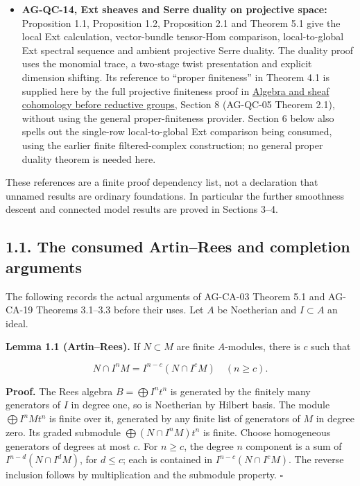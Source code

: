 \documentclass[11pt,a4paper,openany]{report}
\begin{document}
\begin{itemize}
\item
  \textbf{AG-QC-14, Ext sheaves and Serre duality on projective space:} Proposition 1.1, Proposition 1.2, Proposition 2.1 and Theorem 5.1 give the local Ext calculation, vector-bundle tensor-Hom comparison, local-to-global Ext spectral sequence and ambient projective Serre duality. The duality proof uses the monomial trace, a two-stage twist presentation and explicit dimension shifting. Its reference to ``proper finiteness'' in Theorem 4.1 is supplied here by the full projective finiteness proof in \href{https://github.com/KokunoYumeto/open-math-courses/blob/main/docs/courses/AG-RG/AG-RG-S01.md}{Algebra and sheaf cohomology before reductive groups}, Section 8 (AG-QC-05 Theorem 2.1), without using the general proper-finiteness provider. Section 6 below also spells out the single-row local-to-global Ext comparison being consumed, using the earlier finite filtered-complex construction; no general proper duality theorem is needed here.
\end{itemize}

These references are a finite proof dependency list, not a declaration that unnamed results are ordinary foundations. In particular the further smoothness descent and connected model results are proved in Sections 3--4.

\subsection{1.1. The consumed Artin--Rees and completion arguments}\label{AG-RG-S02-the-consumed-artinrees-and-completion-arguments}

The following records the actual arguments of AG-CA-03 Theorem 5.1 and AG-CA-19 Theorems 3.1--3.3 before their uses. Let \(A\) be Noetherian and \(I\subset A\) an ideal.

\textbf{Lemma 1.1 (Artin--Rees).} If \(N\subset M\) are finite \(A\)-modules, there is \(c\) such that

\[
N\cap I^nM=I^{n-c}(N\cap I^cM)\quad(n\geq c).
\]

\textbf{Proof.} The Rees algebra \(B=\bigoplus I^nt^n\) is generated by the finitely many generators of \(I\) in degree one, so is Noetherian by Hilbert basis. The module \(\bigoplus I^nMt^n\) is finite over it, generated by any finite list of generators of \(M\) in degree zero. Its graded submodule \(\bigoplus(N\cap I^nM)t^n\) is finite. Choose homogeneous generators of degrees at most \(c\). For \(n\geq c\), the degree \(n\) component is a sum of \(I^{n-d}(N\cap I^dM)\), for \(d\leq c\); each is contained in \(I^{n-c}(N\cap I^cM)\). The reverse inclusion follows by multiplication and the submodule property. \(\square\)
\end{document}
